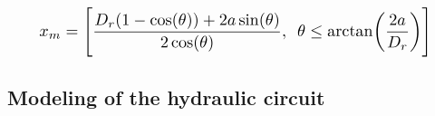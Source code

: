 \documentclass[3p,twocolumn,preprint]{elsarticle}
\begin{document}
\begin{equation}
\resizebox{.9\linewidth}{!}{$	
x_m = \Biggl[ \dfrac{D_r(1-\cos(\theta))+2a\sin(\theta)}{2\cos(\theta)}\text{,}
				~~ \theta\leq\arctan\biggl(\dfrac{2a}{D_r}\biggr) \Biggr]
				$}
\label{eq:theta_fonction_de_xm}
\end{equation}

	\subsection{Modeling of the hydraulic circuit}	
	\label{subsec:The hydraulic circuit}
\end{document}
